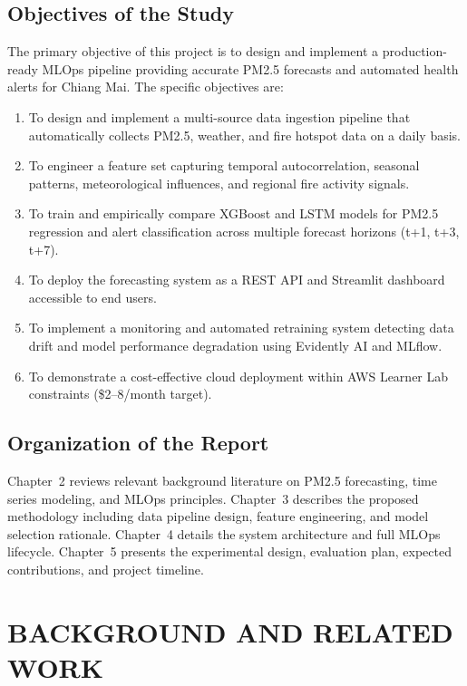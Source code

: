 \documentclass[12pt,a4paper]{report}
\begin{document}
\section{Objectives of the Study}

The primary objective of this project is to design and implement a production-ready MLOps pipeline providing accurate PM2.5 forecasts and automated health alerts for Chiang Mai. The specific objectives are:

\begin{enumerate}
  \item To design and implement a multi-source data ingestion pipeline that automatically collects PM2.5, weather, and fire hotspot data on a daily basis.
  \item To engineer a feature set capturing temporal autocorrelation, seasonal patterns, meteorological influences, and regional fire activity signals.
  \item To train and empirically compare XGBoost and LSTM models for PM2.5 regression and alert classification across multiple forecast horizons (t+1, t+3, t+7).
  \item To deploy the forecasting system as a REST API and Streamlit dashboard accessible to end users.
  \item To implement a monitoring and automated retraining system detecting data drift and model performance degradation using Evidently AI and MLflow.
  \item To demonstrate a cost-effective cloud deployment within AWS Learner Lab constraints (\$2--8/month target).
\end{enumerate}

\section{Organization of the Report}

Chapter~2 reviews relevant background literature on PM2.5 forecasting, time series modeling, and MLOps principles. Chapter~3 describes the proposed methodology including data pipeline design, feature engineering, and model selection rationale. Chapter~4 details the system architecture and full MLOps lifecycle. Chapter~5 presents the experimental design, evaluation plan, expected contributions, and project timeline.

\chapter{BACKGROUND AND RELATED WORK}
\end{document}
